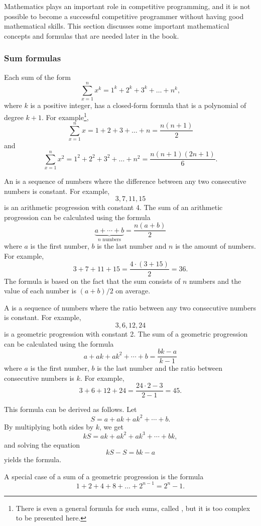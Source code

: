 Mathematics plays an important role in competitive
programming, and it is not possible to become
a successful competitive programmer without
having good mathematical skills.
This section discusses some important
mathematical concepts and formulas that
are needed later in the book.

\subsubsection{Sum formulas}

Each sum of the form
\[\sum_{x=1}^n x^k = 1^k+2^k+3^k+\ldots+n^k,\]
where $k$ is a positive integer,
has a closed-form formula that is a
polynomial of degree $k+1$.
For example\footnote{
There is even a general formula for such sums, called ,
but it is too complex to be presented here.},
\[\sum_{x=1}^n x = 1+2+3+\ldots+n = \frac{n(n+1)}{2}\]
and
\[\sum_{x=1}^n x^2 = 1^2+2^2+3^2+\ldots+n^2 = \frac{n(n+1)(2n+1)}{6}.\]

An  is a 
sequence of numbers
where the difference between any two consecutive
numbers is constant.
For example,
\[3, 7, 11, 15\]
is an arithmetic progression with constant 4.
The sum of an arithmetic progression can be calculated
using the formula
\[\underbrace{a + \cdots + b}_{n \,\, \textrm{numbers}} = \frac{n(a+b)}{2}\]
where $a$ is the first number,
$b$ is the last number and
$n$ is the amount of numbers.
For example,
\[3+7+11+15=\frac{4 \cdot (3+15)}{2} = 36.\]
The formula is based on the fact
that the sum consists of $n$ numbers and
the value of each number is $(a+b)/2$ on average.

A  is a sequence
of numbers
where the ratio between any two consecutive
numbers is constant.
For example,
\[3,6,12,24\]
is a geometric progression with constant 2.
The sum of a geometric progression can be calculated
using the formula
\[a + ak + ak^2 + \cdots + b = \frac{bk-a}{k-1}\]
where $a$ is the first number,
$b$ is the last number and the
ratio between consecutive numbers is $k$.
For example,
\[3+6+12+24=\frac{24 \cdot 2 - 3}{2-1} = 45.\]

This formula can be derived as follows. Let
\[ S = a + ak + ak^2 + \cdots + b .\]
By multiplying both sides by $k$, we get
\[ kS = ak + ak^2 + ak^3 + \cdots + bk,\]
and solving the equation
\[ kS-S = bk-a\]
yields the formula.

A special case of a sum of a geometric progression is the formula
\[1+2+4+8+\ldots+2^{n-1}=2^n-1.\]

